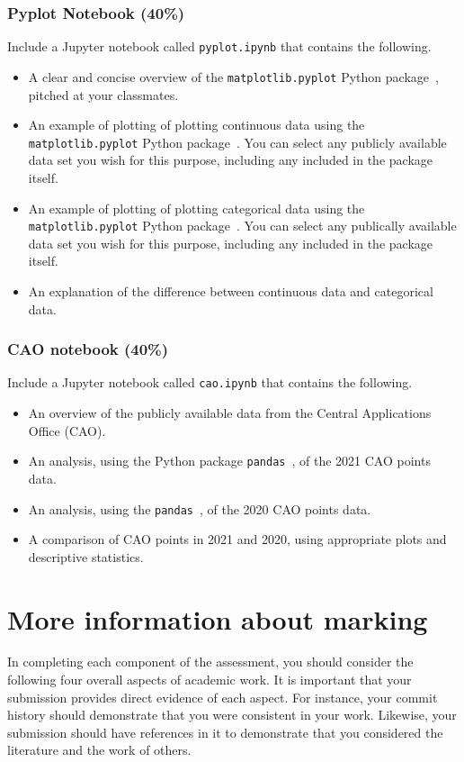 \documentclass[a4paper, 12pt]{scrartcl}
\begin{document}
  \subsubsection*{Pyplot Notebook (40\%)}
  Include a Jupyter notebook called \texttt{pyplot.ipynb} that contains the following.
  \begin{itemize}
    \item A clear and concise overview of the \texttt{matplotlib.pyplot} Python package~\cite{pyplot}, pitched at your classmates.
    \item An example of plotting of plotting continuous data using the \texttt{matplotlib.pyplot} Python package~\cite{pyplot}. You can select any publicly available data set you wish for this purpose, including any included in the package itself.
    \item An example of plotting of plotting categorical data using the \texttt{matplotlib.pyplot} Python package~\cite{pyplot}. You can select any publically available data set you wish for this purpose, including any included in the package itself.
    \item An explanation of the difference between continuous data and categorical data.
  \end{itemize}

  \subsubsection*{CAO notebook (40\%)}
  Include a Jupyter notebook called \texttt{cao.ipynb} that contains the following.
  \begin{itemize}
    \item An overview of the publicly available data from the Central Applications Office (CAO).
    \item An analysis, using the Python package \texttt{pandas}~\cite{pandas}, of the 2021 CAO points data.
    \item An analysis, using the \texttt{pandas}~\cite{pandas}, of the 2020 CAO points data.
    \item A comparison of CAO points in 2021 and 2020, using appropriate plots and descriptive statistics.
  \end{itemize}

  \section*{More information about marking}
    In completing each component of the assessment, you should consider the following four overall aspects of academic work.
    It is important that your submission provides direct evidence of each aspect.
    For instance, your commit history should demonstrate that you were consistent in your work.
    Likewise, your submission should have references in it to demonstrate that you considered the literature and the work of others.
  
\end{document}
